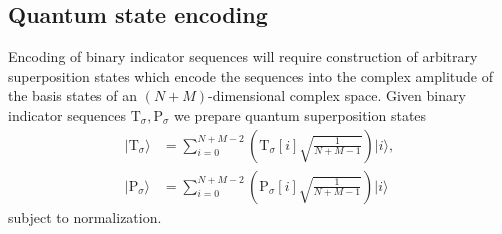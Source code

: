 \subsection{Quantum state encoding}
\label{subsec:esquid}
Encoding of binary indicator sequences will require construction of arbitrary superposition states which encode the sequences into the complex amplitude of the basis states of an $(N+M)$-dimensional complex space. Given binary indicator sequences $\text{T}_{\sigma}, \text{P}_{\sigma}$ we prepare quantum superposition states
\begin{equation*}
	\begin{split}
		\vert \text{T}_{\sigma} \rangle	 &= \sum_{i=0}^{N+M-2} \left(\text{T}_{\sigma}[i] \sqrt{\frac{1}{N+M-1}}\right) \vert i \rangle,\\
		\vert \text{P}_{\sigma} \rangle	 &= \sum_{i=0}^{N+M-2} \left(\text{P}_{\sigma}[i] \sqrt{\frac{1}{N+M-1}}\right) \vert i \rangle
	\end{split}
\end{equation*}
subject to normalization.

